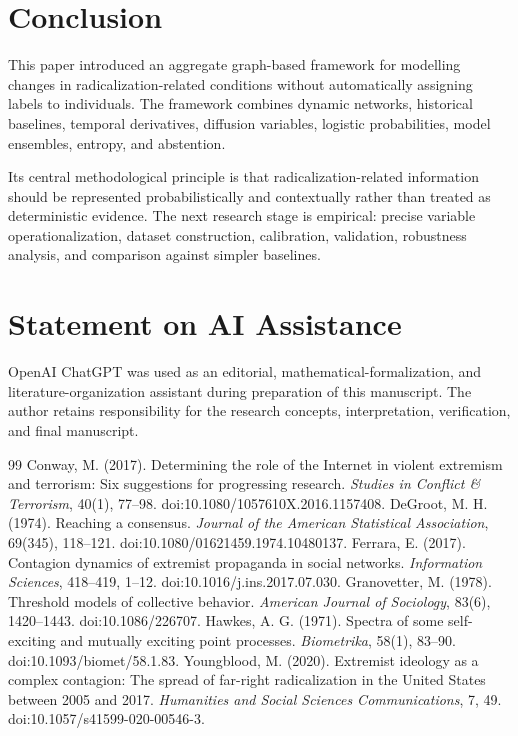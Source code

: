 \documentclass[11pt,letterpaper]{article}
\begin{document}
\section{Conclusion}
This paper introduced an aggregate graph-based framework for modelling changes in radicalization-related conditions without automatically assigning labels to individuals. The framework combines dynamic networks, historical baselines, temporal derivatives, diffusion variables, logistic probabilities, model ensembles, entropy, and abstention.

Its central methodological principle is that radicalization-related information should be represented probabilistically and contextually rather than treated as deterministic evidence. The next research stage is empirical: precise variable operationalization, dataset construction, calibration, validation, robustness analysis, and comparison against simpler baselines.

\section*{Statement on AI Assistance}
OpenAI ChatGPT was used as an editorial, mathematical-formalization, and literature-organization assistant during preparation of this manuscript. The author retains responsibility for the research concepts, interpretation, verification, and final manuscript.

\begin{thebibliography}{99}
 Conway, M. (2017). Determining the role of the Internet in violent extremism and terrorism: Six suggestions for progressing research. \emph{Studies in Conflict \& Terrorism}, 40(1), 77--98. doi:10.1080/1057610X.2016.1157408.
 DeGroot, M. H. (1974). Reaching a consensus. \emph{Journal of the American Statistical Association}, 69(345), 118--121. doi:10.1080/01621459.1974.10480137.
 Ferrara, E. (2017). Contagion dynamics of extremist propaganda in social networks. \emph{Information Sciences}, 418--419, 1--12. doi:10.1016/j.ins.2017.07.030.
 Granovetter, M. (1978). Threshold models of collective behavior. \emph{American Journal of Sociology}, 83(6), 1420--1443. doi:10.1086/226707.
 Hawkes, A. G. (1971). Spectra of some self-exciting and mutually exciting point processes. \emph{Biometrika}, 58(1), 83--90. doi:10.1093/biomet/58.1.83.
 Youngblood, M. (2020). Extremist ideology as a complex contagion: The spread of far-right radicalization in the United States between 2005 and 2017. \emph{Humanities and Social Sciences Communications}, 7, 49. doi:10.1057/s41599-020-00546-3.
\end{thebibliography}
\end{document}
